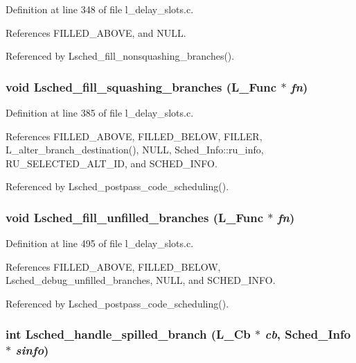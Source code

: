 Definition at line 348 of file l\_\-delay\_\-slots.c.

References FILLED\_\-ABOVE, and NULL.

Referenced by Lsched\_\-fill\_\-nonsquashing\_\-branches().
\subsubsection{\setlength{\rightskip}{0pt plus 5cm}void Lsched\_\-fill\_\-squashing\_\-branches (L\_\-Func $\ast$ {\em fn})}\label{l__delay__slots_8c_1575d9431756a2b1b0193d363fcaad7c}




Definition at line 385 of file l\_\-delay\_\-slots.c.

References FILLED\_\-ABOVE, FILLED\_\-BELOW, FILLER, L\_\-alter\_\-branch\_\-destination(), NULL, Sched\_\-Info::ru\_\-info, RU\_\-SELECTED\_\-ALT\_\-ID, and SCHED\_\-INFO.

Referenced by Lsched\_\-postpass\_\-code\_\-scheduling().
\subsubsection{\setlength{\rightskip}{0pt plus 5cm}void Lsched\_\-fill\_\-unfilled\_\-branches (L\_\-Func $\ast$ {\em fn})}\label{l__delay__slots_8c_b19c2b3371e7f6c65e56e81a3f5f2f16}




Definition at line 495 of file l\_\-delay\_\-slots.c.

References FILLED\_\-ABOVE, FILLED\_\-BELOW, Lsched\_\-debug\_\-unfilled\_\-branches, NULL, and SCHED\_\-INFO.

Referenced by Lsched\_\-postpass\_\-code\_\-scheduling().
\subsubsection{\setlength{\rightskip}{0pt plus 5cm}int Lsched\_\-handle\_\-spilled\_\-branch (L\_\-Cb $\ast$ {\em cb}, \bf{Sched\_\-Info} $\ast$ {\em sinfo})}\label{l__delay__slots_8c_6de719e078b25892d78ade0a72a72e1f}




